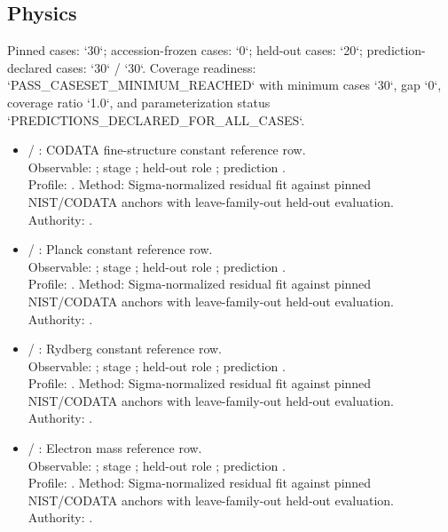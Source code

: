 \subsection{Physics}
Pinned cases: `30`; accession-frozen cases: `0`; held-out cases: `20`; prediction-declared cases: `30` / `30`.
Coverage readiness: `PASS\_CASESET\_MINIMUM\_REACHED` with minimum cases `30`, gap `0`, coverage ratio `1.0`, and parameterization status `PREDICTIONS\_DECLARED\_FOR\_ALL\_CASES`.
\begin{itemize}
\item {} / : CODATA fine-structure constant reference row.\\ Observable: ; stage ; held-out role ; prediction .\\ Profile: . Method: Sigma-normalized residual fit against pinned NIST/CODATA anchors with leave-family-out held-out evaluation. Authority: .
\item {} / : Planck constant reference row.\\ Observable: ; stage ; held-out role ; prediction .\\ Profile: . Method: Sigma-normalized residual fit against pinned NIST/CODATA anchors with leave-family-out held-out evaluation. Authority: .
\item {} / : Rydberg constant reference row.\\ Observable: ; stage ; held-out role ; prediction .\\ Profile: . Method: Sigma-normalized residual fit against pinned NIST/CODATA anchors with leave-family-out held-out evaluation. Authority: .
\item {} / : Electron mass reference row.\\ Observable: ; stage ; held-out role ; prediction .\\ Profile: . Method: Sigma-normalized residual fit against pinned NIST/CODATA anchors with leave-family-out held-out evaluation. Authority: .

\end{itemize}
